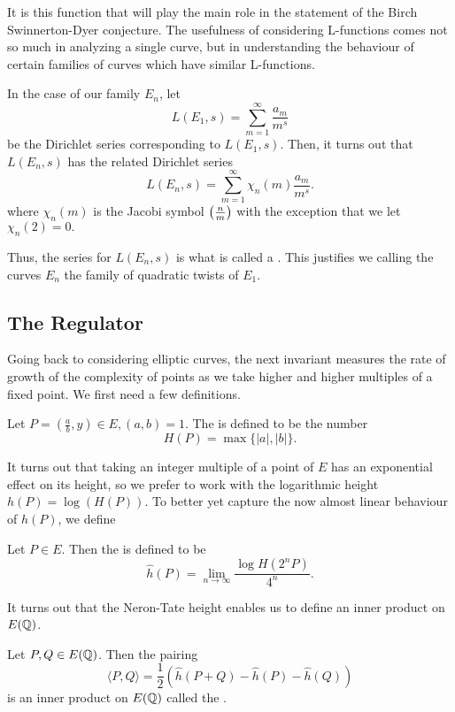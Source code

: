 \documentclass[12pt, a4paper]{amsart}
\begin{document}
It is this function that will play the main role in the statement of the Birch
Swinnerton-Dyer conjecture. The usefulness of considering L-functions comes not
so much in analyzing a single curve, but in understanding the behaviour of
certain families of curves which have similar L-functions.

In the case of our family $E_n$, let
\[L(E_1,s) = \sum\limits_{m=1}^\infty \frac{a_m}{m^s}\]
be the Dirichlet series corresponding to $L(E_1,s)$. Then, it turns out that
$L(E_n,s)$ has the related Dirichlet series
\[L(E_n,s) = \sum_{m=1}^\infty \chi_n(m) \frac{a_m}{m^s}. \]
where $\chi_n(m)$ is the Jacobi symbol
$\left(\frac{n}{m}\right)$ with the exception that we let $\chi_n(2) = 0.$

Thus, the series for $L(E_n,s)$ is what is called a . This justifies we calling
the curves $E_n$ the family of quadratic twists of $E_1$.

\subsection{The Regulator}

Going back to considering elliptic curves, the next invariant measures the
rate of growth of the complexity of points as we take higher and higher
multiples of a fixed point. We first need a few definitions.

\begin{defn}
  Let $P = (\frac{a}{b},y) \in E, (a,b) = 1$. The  is
  defined to be the number
  \[ H(P) = \max \{|a|, |b| \}.\]
\end{defn}

It turns out that taking an integer multiple of a point of $E$ has an
exponential effect on its height, so we prefer to work with the logarithmic
height $h(P) = \log (H(P))$. To better yet capture the now almost linear
behaviour of $h(P)$, we define

\begin{defn}
  Let $P \in E$. Then the  is defined to be
  \[ \hat{h}(P) = \lim\limits_{n \rightarrow \infty} \frac{\log H(2^n P)}{4^n}. \]
\end{defn}

It turns out that the Neron-Tate height enables us to define an inner product
on $E({\mathbb Q})$.

\begin{defn}
  Let $P, Q \in E({\mathbb Q})$. Then the pairing
  \[ \langle P,Q \rangle =
    \frac{1}{2} \left( \hat{h}(P+Q) - \hat{h}(P) - \hat{h}(Q) \right)\]
  is an inner product on $E({\mathbb Q})$ called the .
\end{defn}
\end{document}
